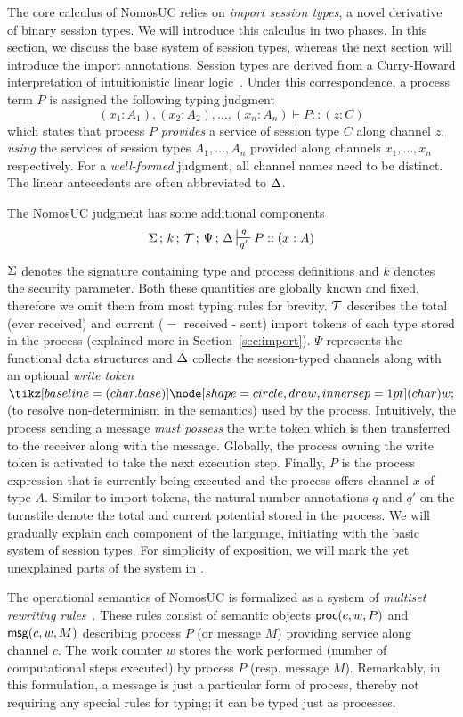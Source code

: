 
The core calculus of NomosUC relies on \emph{import session types}, a novel derivative of
binary session types.
We will introduce this calculus in two phases.
In this section, we discuss the base system of session types, whereas the next section
will introduce the import annotations.
Session types are derived from a Curry-Howard interpretation of intuitionistic linear logic~\cite{girard1987linear}.
Under this correspondence, a process term $P$ is assigned the following typing judgment
\[
(x_1 : A_1), (x_2 : A_2), \ldots, (x_n : A_n) \vdash P :: (z : C)
\]
which states that process $P$ \emph{provides} a service
of session type $C$ along channel $z$, \emph{using} the services of session
types $A_1, \ldots, A_n$ provided along channels $x_1, \ldots, x_n$ respectively.
For a \emph{well-formed} judgment, all channel names need to be distinct.
The linear antecedents are often abbreviated to $\Delta$.

The NomosUC judgment has some additional components
\[
\Sg \semi k \semi \Tokens \semi \Psi \semi \D \entailpot{q}{q'} P :: (x : A)
\]

$\Sigma$ denotes the signature containing type and process definitions and $k$
denotes the security parameter.
Both these quantities are globally known and fixed, therefore we omit them from
most typing rules for brevity.
$\mathcal{T}$ describes the total (ever received) and current ($=$ received - sent) import tokens
of each type stored in the process (explained more in Section~\ref{sec:import}).
$\Psi$ represents the functional data structures and $\Delta$ collects the
session-typed channels along with an optional \emph{write token} $\wt$
(to resolve non-determinism in the semantics) used by the process.
Intuitively, the process sending a message \emph{must possess} the write
token which is then transferred to the receiver along with the message.
Globally, the process owning the write token is activated to take the
next execution step.
Finally, $P$ is the process expression that is currently being executed and
the process offers channel $x$ of type $A$.
Similar to import tokens, the natural number annotations $q$ and $q'$ on the turnstile
denote the total and current potential stored in the process.
We will gradually explain each component of the language, initiating
with the basic system of session types.
For simplicity of exposition, we will mark the yet unexplained
parts of the system in .

The operational semantics of NomosUC is formalized as a
system of \emph{multiset rewriting rules}~\cite{cervesato2009relating}.
These rules consist of semantic objects $\mathsf{proc}(c, w, P)$ and $\mathsf{msg}(c, w, M)$ describing
process $P$ (or message $M$) providing service along channel $c$.
The work counter $w$ stores the work performed
(number of computational steps executed) by process $P$ (resp. message $M$).
Remarkably, in this formulation, a message is just a particular form of process,
thereby not requiring any special rules for typing; it can be typed just as processes.

